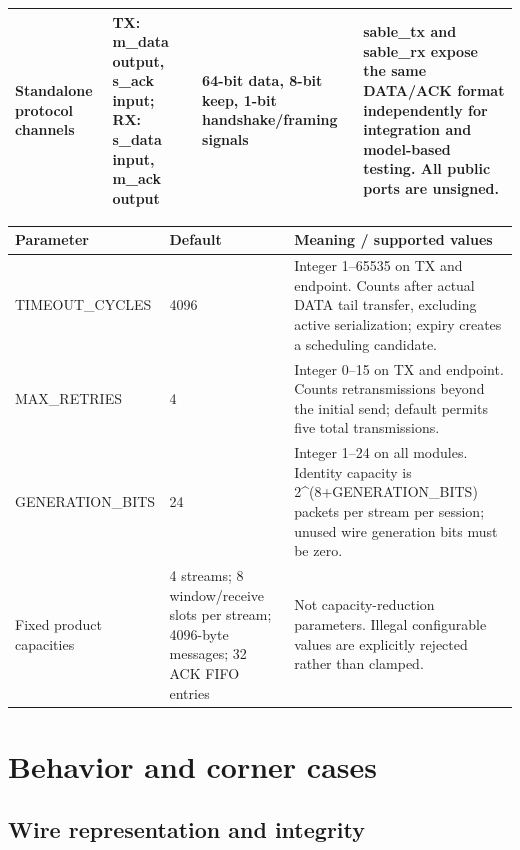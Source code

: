 \documentclass[11pt,a4paper]{article}
\begin{document}
{\begin{longtable}{@{}L{0.2\textwidth}L{0.12\textwidth}L{0.1\textwidth}L{0.48\textwidth}@{}}
Standalone protocol channels & TX: m\_\allowbreak{}data output,\allowbreak{} s\_\allowbreak{}ack input; RX: s\_\allowbreak{}data input,\allowbreak{} m\_\allowbreak{}ack output & 64-bit data,\allowbreak{} 8-bit keep,\allowbreak{} 1-bit handshake/\allowbreak{}framing signals & sable\_\allowbreak{}tx and sable\_\allowbreak{}rx expose the same DATA/\allowbreak{}ACK format independently for integration and model-based testing. All public ports are unsigned.\\[3pt]

\bottomrule\end{longtable}}

{\small\begin{longtable}{@{}L{0.23\textwidth}L{0.12\textwidth}L{0.57\textwidth}@{}}\toprule

\textbf{Parameter} & \textbf{Default} & \textbf{Meaning /\allowbreak{} supported values}\\\midrule\endhead

TIMEOUT\_\allowbreak{}CYCLES & 4096 & Integer 1–65535 on TX and endpoint. Counts after actual DATA tail transfer,\allowbreak{} excluding active serialization; expiry creates a scheduling candidate.\\[3pt]

MAX\_\allowbreak{}RETRIES & 4 & Integer 0–15 on TX and endpoint. Counts retransmissions beyond the initial send; default permits five total transmissions.\\[3pt]

GENERATION\_\allowbreak{}BITS & 24 & Integer 1–24 on all modules. Identity capacity is 2\textasciicircum{}(\allowbreak{}8+\allowbreak{}GENERATION\_\allowbreak{}BITS)\allowbreak{} packets per stream per session; unused wire generation bits must be zero.\\[3pt]

Fixed product capacities & 4 streams; 8 window/\allowbreak{}receive slots per stream; 4096-byte messages; 32 ACK FIFO entries & Not capacity-reduction parameters. Illegal configurable values are explicitly rejected rather than clamped.\\[3pt]

\bottomrule\end{longtable}}

\section{Behavior and corner cases}

\subsection{Wire representation and integrity}
\end{document}
